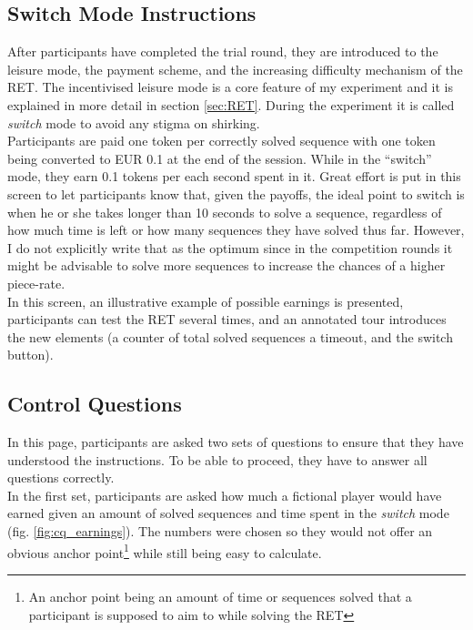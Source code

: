     \subsection{Switch Mode Instructions}
    
    After participants have completed the trial round, they are introduced to the leisure mode, the payment scheme, and the increasing difficulty mechanism of the RET. The incentivised leisure mode is a core feature of my experiment and it is explained in more detail in section \ref{sec:RET}. During the experiment it is called \textit{switch} mode to avoid any stigma on shirking.\\
    
    Participants are paid one token per correctly solved sequence with one token being converted to EUR 0.1 at the end of the session. While in the ``switch'' mode, they earn 0.1 tokens per each second spent in it. Great effort is put in this screen to let participants know that, given the payoffs, the ideal point to switch is when he or she takes longer than 10 seconds to solve a sequence, regardless of how much time is left or how many sequences they have solved thus far. However, I do not explicitly write that as the optimum since in the competition rounds it might be advisable to solve more sequences to increase the chances of a higher piece-rate.\\
    
    In this screen, an illustrative example of possible earnings is presented, participants can test the RET several times, and an annotated tour introduces the new elements (a counter of total solved sequences a timeout, and the switch button).
    
    \subsection{Control Questions}
    
    In this page, participants are asked two sets of questions to ensure that they have understood the instructions. To be able to proceed, they have to answer all questions correctly.\\
    
    In the first set, participants are asked how much a fictional player would have earned given an amount of solved sequences and time spent in the \textit{switch} mode (fig. \ref{fig:cq_earnings}). The numbers were chosen so they would not offer an obvious anchor point\footnote{An anchor point being an amount of time or sequences solved that a participant is supposed to aim to while solving the RET} while still being easy to calculate.\\
    
